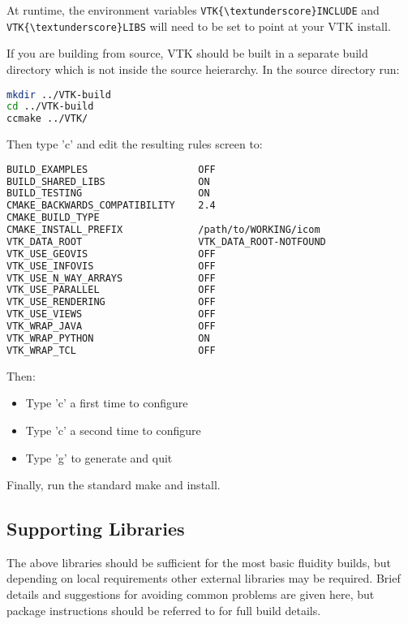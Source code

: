 At runtime, the environment variables
\lstinline[language=bash]+VTK{\textunderscore}INCLUDE+ and
\lstinline[language=bash]+VTK{\textunderscore}LIBS+ will need to be set to
point at your VTK install.

If you are building from source, VTK should be built in a separate build
directory which is not inside the source heierarchy. In the source directory
run:

\begin{lstlisting}[language=bash]
mkdir ../VTK-build
cd ../VTK-build
ccmake ../VTK/
\end{lstlisting}

Then type 'c' and edit the resulting rules screen to:

\begin{lstlisting}[language=bash]
BUILD_EXAMPLES                   OFF
BUILD_SHARED_LIBS                ON                                     
BUILD_TESTING                    ON
CMAKE_BACKWARDS_COMPATIBILITY    2.4
CMAKE_BUILD_TYPE
CMAKE_INSTALL_PREFIX             /path/to/WORKING/icom          
VTK_DATA_ROOT                    VTK_DATA_ROOT-NOTFOUND
VTK_USE_GEOVIS                   OFF                                    
VTK_USE_INFOVIS                  OFF                                    
VTK_USE_N_WAY_ARRAYS             OFF
VTK_USE_PARALLEL                 OFF
VTK_USE_RENDERING                OFF                                    
VTK_USE_VIEWS                    OFF                                    
VTK_WRAP_JAVA                    OFF
VTK_WRAP_PYTHON                  ON                                     
VTK_WRAP_TCL                     OFF
\end{lstlisting}

Then:

\begin{itemize}
  \item Type 'c' a first time to configure
  \item Type 'c' a second time to configure
  \item Type 'g' to generate and quit
\end{itemize}

Finally, run the standard make and install.

\subsection{Supporting Libraries}
\label{sect:required_libraries_supporting}

The above libraries should be sufficient for the most basic fluidity builds,
but depending on local requirements other external libraries may be required.
Brief details and suggestions for avoiding common problems are given here, but
package instructions should be referred to for full build details.


